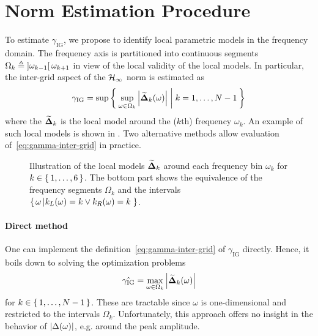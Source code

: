 \section{\Hinf{} Norm Estimation Procedure}
\label{sec:LPMHinf}
To estimate $\gamma_{\mathrm{IG}}$, we propose to identify local parametric models in the frequency domain.
The frequency axis is partitioned into continuous segments $\Omega_k \triangleq \left]  \omega_{k-1}  \right[{ \omega_{k+1} }$ in view of the local validity of the local models.
In particular, the inter-grid aspect of the $\mathcal{H}_{\infty}$ norm is estimated as
\begin{equation}
  \gamma_{\mathrm{IG}} = 
    \sup \Set{ 
                \sup_{\omega \in \Omega_k}  \left| \ensuremath{\widetilde{\mathbf{\Delta}}}_k(\omega) \right|
                |
                k = 1,\ldots,N-1
                }
   \label{eq:gamma-inter-grid}
\end{equation}
where the $\widetilde{\mathbf{\Delta}}_{k}$ is the local model around the ($k$th) frequency $\omega_k$.
An example of such local models is shown in .
Two alternative methods allow evaluation of~\eqref{eq:gamma-inter-grid} in practice.

\begin{figure}
  \centering
  \setlength{\figurewidth}{0.68\columnwidth}
  \setlength{\figureheight}{0.68\figurewidth}
  
  \caption[Illustration of the local models.]{Illustration of the local models $\widetilde{\mathbf{\Delta}}_k$ around each frequency bin $\omega_k$ for $k\in\set{1,\ldots,6}$.
  The bottom part shows the equivalence of the frequency segments $\Omega_k$ and the intervals $\set{\omega \left| k_L(\omega) = k \vee k_R(\omega) = k \right.}$.}
\label{fig:interpol-quantities}
\end{figure}

\paragraph*{Direct method}
One can implement the definition~\eqref{eq:gamma-inter-grid} of $\gamma_{\mathrm{IG}}$ directly.
Hence, it boils down to solving the optimization problems
\begin{equation}
  \hat{\gamma_{\mathrm{IG}}} = 
      \max_{\omega \in \Omega_k} 
      \left| \widetilde{\mathbf{\Delta}}_k(\omega) \right|
      \label{eq:gamma-direct}
\end{equation}
for $k \in \set{1,\ldots,N-1}$.
These are tractable since $\omega$ is one-dimensional and restricted to the intervals $\Omega_k$.
Unfortunately, this approach offers no insight in the behavior of $\left| \Delta(\omega) \right|$, e.g. around the peak amplitude.

